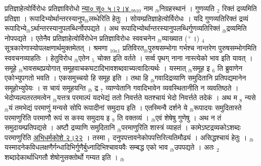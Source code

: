 \documentclass[article,12pt,a4paper]{memoir}%
\newcommand{\add}[1]{($^{+}$#1)}
\newcounter{parCount}
\begin{document}
	  
	  \pstart \leavevmode%
	\hphantom{.}प्रतिज्ञाहेत्वोर्विरोधः प्रतिज्ञाविरोधो \href{http://sarit.indology.info/?cref=ns\%C5\%AB.5.2.4}{न्या० सू० ५।२।४ }{\tiny $_{9b10}$} नाम {\tiny $_{lb}$}निग्रहस्थानं । गुणव्यति {\tiny $_{2}$} रिक्तं द्रव्यमिति प्रतिज्ञा । रूपादिभ्योर्थान्तरस्यानुप{\tiny $_{lb}$}लब्धेरिति हेतुः । सोयम्प्रतिज्ञाहेत्वोर्विरोधः । यदि गुणव्यतिरिक्तं द्रव्यं रूपादिभ्ये{\tiny $_{lb}$}ऽर्थान्तरस्यानुपलब्धिर्नोपपद्यते । अथ रूपादिभ्योर्थान्तरस्यानुपलब्धिर्गुणव्यतिरिक्तं {\tiny $_{lb}$}द्रव्यमिति नोपपद्यते । एतेनैव प्रतिज्ञाहेत्वोर्विरोधेन प्रतिज्ञाविरोधः स्ववचनेन {\tiny $_{lb}$}व्याख्यात \add{।} {\tiny $_{4}$} सूत्रकारेणास्योपलक्षणार्थमुक्तमेतत् । श्रमणा {\tiny $_{10a1}$} प्रतिविरत{\tiny $_{lb}$}पुरुषसम्भोगा गर्भश्च नान्तरेण पुरुषसम्भोगमिति स्ववचनव्याहतिः । हेतुविरोध {\tiny $_{lb}$}एतेन {\tiny $_{5}$} चोक्त इति वर्तते । सर्व्व पृथग् नाना नास्त्येको भाव इति यावत् । समूहे {\tiny $_{lb}$}भावसब्दप्रयोगात् समूहवाचकघटादिभावशब्दवाच्यत्वादित्यर्थः । यस्मात् {\tiny $_{lb}$}समूह इ {\tiny $_{6}$} ति ब्रुवाणेन एकोभ्युपगतो भवति । एकसमुच्चयो हि समूह इति । तथा हि {\tiny $_{lb}$}गवादिद्रव्याणि समुदितानि प्रतिपद्यमानेन समूहोभ्युपेयः । स चायं समूहयन्ति {\tiny $_{lb}$} \leavevmode{} द्र {\tiny $_{7}$} व्याण्येतानि गवादिभावेन व्यवस्थितानीति न व्यवतिष्ठते । भेदोप्यल्पतरतमत्वेन {\tiny $_{lb}$}यत्तत्र परमाल्पं यदभेद्यं ततो निवर्त्तते यतश्चायं भेदो निवर्त्तते तदेकं । अथ म {\tiny $_{8}$} न्यसे {\tiny $_{lb}$}यं तमभेद्यं परमाणुं मन्यसे सोपि रूपादीनां समुदाय इति । एतस्मिन्वै दर्शने ये {\tiny $_{lb}$}रूपादयः समुदितास्ते परमाणुरिति परमाणौ रूपं स कस्य समुदाय इ {\tiny $_{9}$} \leavevmode{} ति वक्तव्यं । {\tiny $_{lb}$}एवं शेषेषु गुणेषु । अथ न तं समुदायम्प्रतिपद्यसे । अष्टौ द्रव्याणि समुदितानि {\tiny $_{lb}$}परमाणुरिति शास्त्रं व्याहतं । {\color{DodgerBlue3}कामेऽष्टद्रव्यकोऽशब्दः परमाणुरिति \href{http://sarit.indology.info/?cref=ak.2.22}{अभिधर्मकोशे २।२२}} । तस्मा {\tiny $_{1}$} दनुपपत्तावनेकोपपत्तिरित्यतिमौढ्यं । असिद्धश्चायं हेतुः । {\tiny $_{lb}$}यस्मादनेकविधलक्षणैर्गन्धादिभिर्गुणैर्बुध्नादिभिश्चावयवैः सम्बद्ध एको भाव {\tiny $_{lb}$}उपपद्यते । अतः {\tiny $_{2}$} शब्दादेकार्थाधिगतौ शेषोनुसक्तोर्थो गम्यत इति ।
	{}
	\pend%
      {\tiny $_{lb}$}
\end{document}
